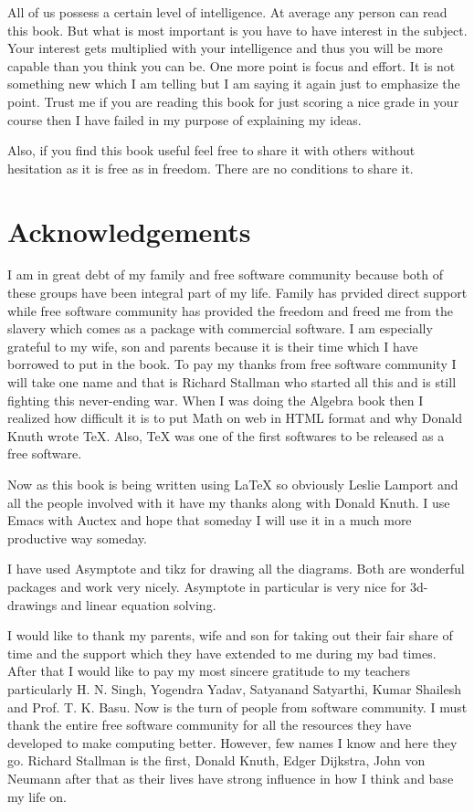 All of us possess a certain level of intelligence. At average any person can read this book. But what is most important is you have
to have interest in the subject. Your interest gets multiplied with your intelligence and thus you will be more capable than you
think you can be. One more point is focus and effort. It is not something new which I am telling but I am saying it again just to
emphasize the point. Trust me if you are reading this book for just scoring a nice grade in your course then I have failed in my
purpose of explaining my ideas.

Also, if you find this book useful feel free to share it with others without hesitation as it is free as in freedom. There are no
conditions to share it.

\section*{Acknowledgements}
I am in great debt of my family and free software community because both of
these groups have been integral part of my life. Family has prvided direct
support while free software community has provided the freedom and freed me
from the slavery which comes as a package with commercial software. I am
especially grateful to my wife, son and parents because it is their time which
I have borrowed to put in the book. To pay my thanks from free software
community  I will take one name and that is Richard Stallman who started all
this  and is still fighting this never-ending war. When I was doing the Algebra
book then I realized how difficult it is to put Math on web in HTML format and
why Donald Knuth wrote \TeX{}. Also, \TeX{} was one of the first softwares to
be released as a free software.

Now as this book is being written using \LaTeX{} so obviously Leslie Lamport
and all the people involved with it have my thanks along with Donald Knuth. I
use Emacs with Auctex and hope that someday I will use it in a much more
productive way someday.

I have used Asymptote and tikz for drawing all the diagrams. Both are wonderful
packages and work very nicely. Asymptote in particular is very nice for 3d-drawings and linear equation solving.

I would like to thank my parents, wife and son for taking out their fair share
of time and the support which they have extended to me during my bad
times. After that I would like to pay my most sincere gratitude to my teachers
particularly H. N. Singh, Yogendra Yadav, Satyanand Satyarthi, Kumar Shailesh
and Prof. T. K. Basu. Now is the turn of people from software community. I must
thank the entire free software community for all the resources they have
developed to make computing better. However, few names I know and here they
go. Richard Stallman is the first, Donald Knuth, Edger Dijkstra, John von Neumann after that as their lives have strong influence in
how I think and base my life on.

